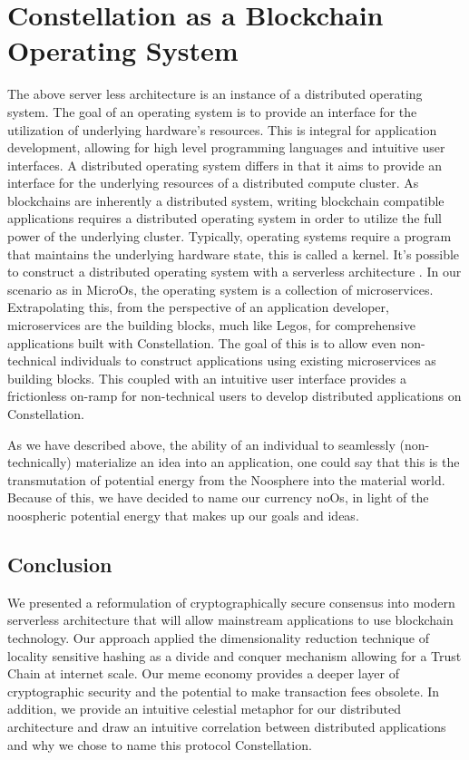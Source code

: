 \documentclass{article}
\begin{document}
\section{Constellation as a Blockchain Operating System}
The above server less architecture is an instance of a distributed operating system. The goal of an operating system is to provide an interface for the utilization of underlying hardware's resources. This is integral for application development, allowing for high level programming languages and intuitive user interfaces. A distributed operating system differs in that it aims to provide an interface for the underlying resources of a distributed compute cluster. As blockchains are inherently a distributed system, writing blockchain compatible applications requires a distributed operating system in order to utilize the full power of the underlying cluster. Typically, operating systems require a program that maintains the underlying hardware state, this is called a kernel. It's possible to construct a distributed operating system with a serverless architecture  . In our scenario as in MicroOs, the operating system is a collection of microservices. Extrapolating this, from the perspective of an application developer, microservices are the building blocks, much like Legos, for comprehensive applications built with Constellation. The goal of this is to allow even non-technical individuals to construct applications using existing microservices as building blocks. This coupled with an intuitive user interface provides a frictionless on-ramp for non-technical users to develop distributed applications on Constellation.

As we have described above, the ability of an individual to seamlessly (non-technically) materialize an idea into an application, one could say that this is the  transmutation of potential energy from the Noosphere into the material world. Because of this, we have decided to name our currency noOs, in light of the noospheric potential energy that makes up our goals and ideas.

\subsection{Conclusion}
We presented a reformulation of cryptographically secure consensus into modern serverless architecture that will allow mainstream applications to use blockchain technology. Our approach applied the dimensionality reduction technique of locality sensitive hashing as a divide and conquer mechanism allowing for a Trust Chain at internet scale. Our meme economy provides a deeper layer of cryptographic security and the potential to make transaction fees obsolete. In addition, we provide an intuitive celestial metaphor for our distributed architecture and draw an intuitive correlation between distributed applications and why we chose to name this protocol Constellation.


\end{document}
